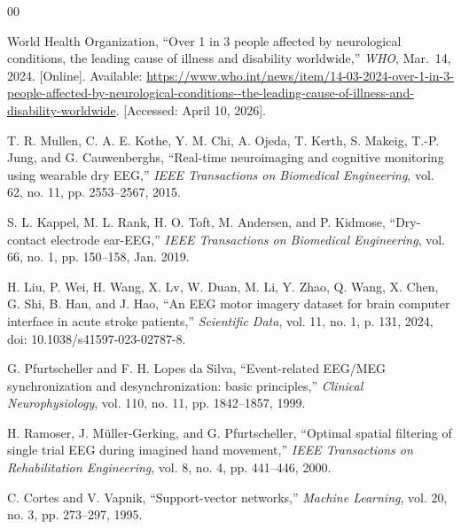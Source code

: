 \begin{thebibliography}{00}



World Health Organization, ``Over 1 in 3 people affected by neurological conditions, the leading cause of illness and disability worldwide,'' \textit{WHO}, Mar.\ 14, 2024. [Online]. Available: \url{https://www.who.int/news/item/14-03-2024-over-1-in-3-people-affected-by-neurological-conditions--the-leading-cause-of-illness-and-disability-worldwide}. [Accessed: April 10, 2026].


T. R. Mullen, C. A. E. Kothe, Y. M. Chi, A. Ojeda, T. Kerth, S. Makeig,
T.-P. Jung, and G. Cauwenberghs, ``Real-time neuroimaging and cognitive monitoring
using wearable dry EEG,'' \textit{IEEE Transactions on Biomedical Engineering},
vol. 62, no. 11, pp. 2553--2567, 2015.

S. L. Kappel, M. L. Rank, H. O. Toft, M. Andersen, and P. Kidmose,
``Dry-contact electrode ear-EEG,'' \textit{IEEE Transactions on Biomedical
Engineering}, vol. 66, no. 1, pp. 150--158, Jan. 2019.

H. Liu, P. Wei, H. Wang, X. Lv, W. Duan, M. Li, Y. Zhao, Q. Wang, X. Chen, G. Shi,
B. Han, and J. Hao, ``An EEG motor imagery dataset for brain computer interface in
acute stroke patients,'' \textit{Scientific Data}, vol. 11, no. 1, p. 131, 2024,
doi: 10.1038/s41597-023-02787-8.

G. Pfurtscheller and F. H. Lopes da Silva, ``Event-related EEG/MEG synchronization
and desynchronization: basic principles,'' \textit{Clinical Neurophysiology},
vol. 110, no. 11, pp. 1842--1857, 1999.

H. Ramoser, J. M\"{u}ller-Gerking, and G. Pfurtscheller, ``Optimal spatial filtering
of single trial EEG during imagined hand movement,'' \textit{IEEE Transactions on
Rehabilitation Engineering}, vol. 8, no. 4, pp. 441--446, 2000.

C. Cortes and V. Vapnik, ``Support-vector networks,'' \textit{Machine Learning},
vol. 20, no. 3, pp. 273--297, 1995.


\end{thebibliography}
